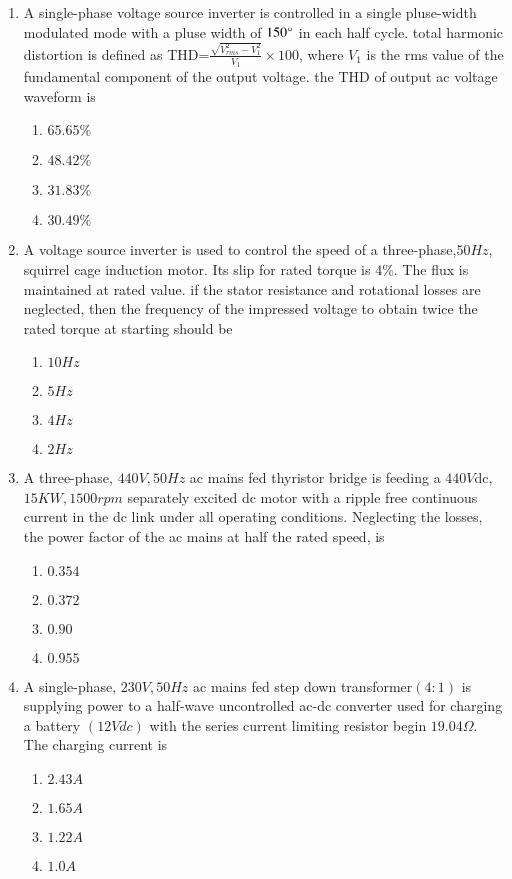 \documentclass[journal,12pt,onecolumn]{IEEEtran}
\theoremstyle{remark}
\begin{document}
\begin{enumerate}
\item A single-phase voltage source inverter is controlled in a single pluse-width modulated mode with a pluse width of $150\degree$ in each half cycle. total harmonic distortion is defined as THD=$\frac{\sqrt{V_{rms}^2-V_1^2}}{V_1}\times 100$, where $V_1$ is the rms value of the fundamental component of the output voltage. the THD of output ac voltage waveform is 
\begin{enumerate}
    \item $65.65\% $
    \item $48.42\%$
    \item $31.83\% $
    \item $30.49 \%$\\
\end{enumerate}

\item A voltage source inverter is used to control the speed of a three-phase,$50 Hz$, squirrel cage induction motor. Its slip for rated torque is $4\%$. The flux is maintained at rated value. if the stator resistance and rotational losses are neglected, then the frequency of the impressed voltage to obtain twice the rated torque at starting should be 
\begin{enumerate}
    \item $10 Hz$
    \item $5 Hz$
    \item $4 Hz$
    \item $2 Hz$\\
\end{enumerate}

\item A three-phase, $440V,50 Hz$ ac mains fed thyristor bridge is feeding a $440 V $dc, $15 KW, 1500 rpm$ separately excited dc motor with a ripple free continuous current in the dc link under all operating conditions. Neglecting the losses, the power factor of the ac mains at half the rated speed, is 
\begin{enumerate}
    \item $0.354$
    \item $0.372$
    \item $0.90$
    \item $0.955$\\
\end{enumerate}

\item A single-phase, $230V,50Hz$ ac mains fed step down transformer$(4:1)$ is supplying power to a half-wave uncontrolled ac-dc converter used for charging a battery $(12 V dc)$ with the series current limiting resistor begin $19.04\Omega$. The charging current is 
\begin{enumerate}
    \item $2.43 A$
    \item $1.65 A$
    \item $1.22 A$
    \item $1.0 A $ \\
\end{enumerate}


\end{enumerate}
\end{document}
